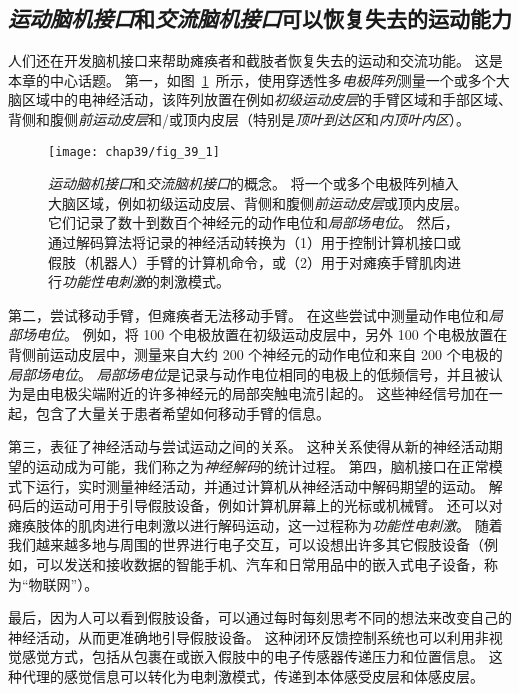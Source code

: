 \subsection{\textit{运动脑机接口}和\textit{交流脑机接口}可以恢复失去的运动能力}

人们还在开发脑机接口来帮助瘫痪者和截肢者恢复失去的运动和交流功能。
这是本章的中心话题。
第一，如图~\ref{fig:39_1}~所示，使用穿透性多\textit{电极阵列}测量一个或多个大脑区域中的电神经活动，该阵列放置在例如\textit{初级运动皮层}的手臂区域和手部区域、背侧和腹侧\textit{前运动皮层}和/或顶内皮层（特别是\textit{顶叶到达区}和\textit{内顶叶内区}）。


\begin{figure}[htbp]
	\centering
	\texttt{[image: chap39/fig\_39\_1]}
	\caption{\textit{运动脑机接口}和\textit{交流脑机接口}的概念。
		将一个或多个电极阵列植入大脑区域，例如初级运动皮层、背侧和腹侧\textit{前运动皮层}或顶内皮层。
		它们记录了数十到数百个神经元的动作电位和\textit{局部场电位}。
		然后，通过解码算法将记录的神经活动转换为（1）用于控制计算机接口或假肢（机器人）手臂的计算机命令，或（2）用于对瘫痪手臂肌肉进行\textit{功能性电刺激}的刺激模式。}
	\label{fig:39_1}
\end{figure}


第二，尝试移动手臂，但瘫痪者无法移动手臂。
在这些尝试中测量动作电位和\textit{局部场电位}。
例如，将 100 个电极放置在初级运动皮层中，另外 100 个电极放置在背侧前运动皮层中，测量来自大约 200 个神经元的动作电位和来自 200 个电极的\textit{局部场电位}。
\textit{局部场电位}是记录与动作电位相同的电极上的低频信号，并且被认为是由电极尖端附近的许多神经元的局部突触电流引起的。
这些神经信号加在一起，包含了大量关于患者希望如何移动手臂的信息。


第三，表征了神经活动与尝试运动之间的关系。
这种关系使得从新的神经活动期望的运动成为可能，我们称之为\textit{神经解码}的统计过程。
第四，脑机接口在正常模式下运行，实时测量神经活动，并通过计算机从神经活动中解码期望的运动。
解码后的运动可用于引导假肢设备，例如计算机屏幕上的光标或机械臂。
还可以对瘫痪肢体的肌肉进行电刺激以进行解码运动，这一过程称为\textit{功能性电刺激}。
随着我们越来越多地与周围的世界进行电子交互，可以设想出许多其它假肢设备（例如，可以发送和接收数据的智能手机、汽车和日常用品中的嵌入式电子设备，称为“物联网”）。


最后，因为人可以看到假肢设备，可以通过每时每刻思考不同的想法来改变自己的神经活动，从而更准确地引导假肢设备。
这种闭环反馈控制系统也可以利用非视觉感觉方式，包括从包裹在或嵌入假肢中的电子传感器传递压力和位置信息。
这种代理的感觉信息可以转化为电刺激模式，传递到本体感受皮层和体感皮层。


